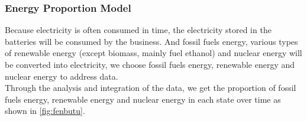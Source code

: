 \subsubsection{Energy Proportion Model}
Because electricity is often consumed in time, the electricity stored in the batteries will be consumed by the business. And fossil fuels energy, various types of renewable energy (except biomass, mainly fuel ethanol) and nuclear energy will be converted into electricity,
we choose fossil fuels energy, renewable energy and nuclear energy to address data. \\
Through the analysis and integration of the data, we get the proportion of fossil fuels energy, renewable energy and nuclear energy in each state over time as shown in \autoref{fig:fenbutu}.\\
\begin{figure}[htbp]
	\centering 	                                        %
\end{figure}
